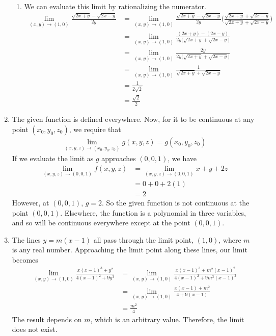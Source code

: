 \begin{enumerate}
\begin{enumerate}
\item  We can evaluate this limit by rationalizing the numerator.
\begin{align*}
  \lim_{(x,y)\rightarrow(1,0) } \frac{\sqrt{2x+y}-\sqrt{2x-y}}{2y} &= 
  \lim_{(x,y)\rightarrow(1,0) } \frac{\sqrt{2x+y}-\sqrt{2x-y}}{2y} \Bigg(\frac{\sqrt{2x+y}+\sqrt{2x-y}}{\sqrt{2x+y}+\sqrt{2x-y}} \Bigg) \\
  &=\lim_{(x,y)\rightarrow(1,0) } \frac{(2x+y)-(2x-y)}{2y \Big(\sqrt{2x+y}+\sqrt{2x-y} \Big)}  \\
  &=\lim_{(x,y)\rightarrow(1,0) } \frac{2y}{2y \Big(\sqrt{2x+y}+\sqrt{2x-y} \Big)}  \\
  &=\lim_{(x,y)\rightarrow(1,0) } \frac{1}{\sqrt{2x+y}+\sqrt{2x-y} }  \\
  &= \frac{1}{2\sqrt{2} }\\
  &= \frac{\sqrt{2}}{2}
\end{align*}
\end{enumerate}
\item
The given function is defined everywhere. Now, for it to be continuous at any point $(x_0,y_0,z_0)$, we require that 
\begin{align*} 
   \lim_{(x,y,z)\rightarrow(x_0,y_0,z_0) } g(x,y,z) = g(x_0,y_0,z_0)
 \end{align*}
If we evaluate the limit as $g$ approaches $(0,0,1)$, we have
\begin{align*}
\lim_{(x,y,z)\rightarrow(0,0,1) } f(x,y,z) 
&= \lim_{(x,y,z)\rightarrow(0,0,1) } x+y+2z \\
&= 0+0+2(1) \\
&= 2
\end{align*}
However, at $(0,0,1)$, $g = 2$. So the given function is not continuous at the point $(0,0,1)$. Elsewhere, the function is a polynomial in three variables, and so will be continuous everywhere except at the point $(0,0,1)$. 
\item The lines $y=m(x-1)$ all pass through the limit point, $(1,0)$, where $m$ is any real number. Approaching the limit point along these lines, our limit becomes
\begin{align*} 
   \lim_{(x,y)\rightarrow(1,0) } \frac{x(x-1)^3 + y^2}{4(x-1)^2+9y^3} 
   &= \lim_{(x,y)\rightarrow(1,0) } \frac{x(x-1)^3 + m^2(x-1)^2}{4(x-1)^2+9m^3(x-1)^3} \\
   &= \lim_{(x,y)\rightarrow(1,0) } \frac{x(x-1) + m^2}{4+9(x-1)} \\
   &= \frac{m^2}{4}
 \end{align*}
 The result depends on $m$, which is an arbitrary value. Therefore, the limit does not exist. 


\end{enumerate}
